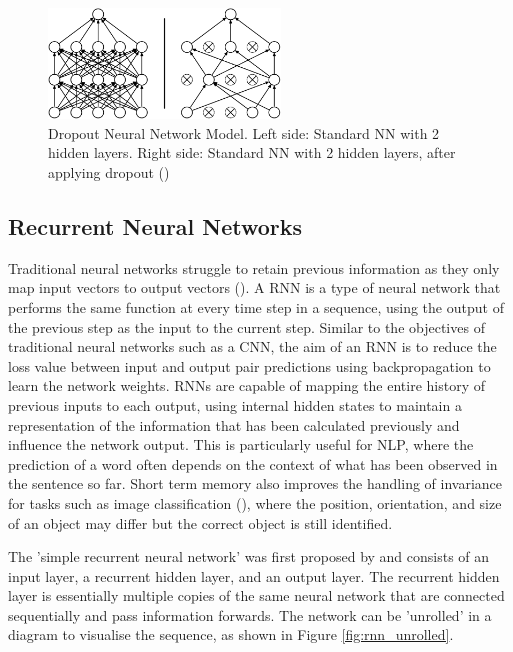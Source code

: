 \begin{figure}[ht!]
\centering
\includegraphics[width=0.55\textwidth]{media/literature/machine_learning/ml_dropout3.png}
\caption[Diagram of the Dropout Neural Network Model]{Dropout Neural Network Model. Left side: Standard \acrshort{NN} with 2 hidden layers. Right side: Standard \acrshort{NN} with 2 hidden layers, after applying dropout (\cite{srivastava_dropout_2014})}
\label{fig:cnn_dropout}
\end{figure}

\subsection{Recurrent Neural Networks}

Traditional neural networks struggle to retain previous information as they only map input vectors to output vectors (\cite{graves_supervised_2012}). A \acrfull{RNN} is a type of neural network that performs the same function at every time step in a sequence, using the output of the previous step as the input to the current step.
Similar to the objectives of traditional neural networks such as a \acrshort{CNN}, the aim of an \acrshort{RNN} is to reduce the loss value between input and output pair predictions using backpropagation to learn the network weights. 
\acrshort{RNN}s are capable of mapping the entire history of previous inputs to each output, using internal hidden states to maintain a representation of the information that has been calculated previously and influence the network output.
This is particularly useful for \acrshort{NLP}, where the prediction of a word often depends on the context of what has been observed in the sentence so far. Short term memory also improves the handling of invariance for tasks such as image classification (\cite{mikolov_recurrent_slides_2010}), where the position, orientation, and size of an object may differ but the correct object is still identified. 

The 'simple recurrent neural network' was first proposed by \cite{elman_original_rnn_1990} and consists of an input layer, a recurrent hidden layer, and an output layer. The recurrent hidden layer is essentially multiple copies of the same neural network that are connected sequentially and pass information forwards. The network can be 'unrolled' in a diagram to visualise the sequence, as shown in Figure \ref{fig:rnn_unrolled}.

